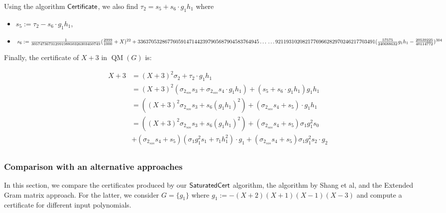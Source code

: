 \documentclass[preprint,12pt,authoryear]{elsarticle}
\DeclareMathOperator{\quadmod}{QM}
\DeclareMathOperator{\algPutinar}{\sf Certificate}
\DeclareMathOperator{\algSaturatedCert}{\sf SaturatedCert}
\begin{document}
Using the algorithm $\algPutinar$, we also find
$\tau_2 = s_5 + s_6 \cdot g_1 h_1$ where

\begin{itemize}
\item $s_5 := \tau_2 - s_6 \cdot g_1 h_1$, 
\item $s_6 := \frac{1}{30574736731299198850326303450749} (\frac{2999}{1000} +
  X)^{22} \\
  +336370532867760591471442397905687904583764945\dots\\
  \dots 9211931020821776966282970246217703491 (\frac{57575}{240688632}g_1
h_1 -\frac{20539225}{40114772})^{304}$ 
\end{itemize}

Finally, the certificate of $X+3$ in $\quadmod(G)$ is:
\vspace{-4mm}

\begin{equation*}
  \label{sec:comp-cert-elem}
  \begin{split}
    X + 3
    &= (X+3)^2 \sigma_2 + \tau_2 \cdot g_1 h_1\\
    &=(X+3)^2 (\sigma_{2_{sos}} s_3 + \sigma_{2_{sos}} s_4 \cdot g_1 h_1) +
      (s_5 + s_6 \cdot g_1 h_1) g_1 h_1\\
    &=((X+3)^2\sigma_{2_{sos}} s_3 + s_6 (g_1 h_1)^{2}) +
      (\sigma_{2_{sos}} s_4 + s_5) \cdot g_1 h_1\\
    &=
      ((X+3)^2\sigma_{2_{sos}} s_3 + s_6 (g_1 h_1)^{2}) +
      (\sigma_{2_{sos}} s_4 + s_5)\sigma_1 g_1^{2} s_0\\
    &+
      (\sigma_{2_{sos}} s_4
      + s_5)(\sigma_1 g_1^{2} s_1 + \tau_1 h_1^{2}) \cdot g_1
      + (\sigma_{2_{sos}} s_4 + s_5)\sigma_1 g_1^{2} s_2\cdot g_2\\
  \end{split}
\end{equation*}

\subsubsection{Comparison with an alternative approaches}

In this section, we compare the certificates produced by our $\algSaturatedCert$
algorithm, the algorithm by Shang et al, and the Extended Gram matrix
approach. For the latter, we consider $G = \{g_1\}$ where
$g_1 := -(X + 2)(X + 1)(X - 1)(X - 3)$ and compute a certificate for different
input polynomials.
\end{document}
